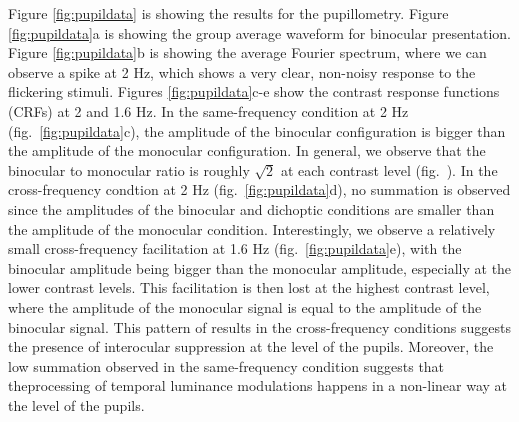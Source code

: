 \documentclass[
]{article}
\begin{document}
Figure \ref{fig:pupildata} is showing the results for the pupillometry. Figure \ref{fig:pupildata}a is showing the group average waveform for binocular presentation. Figure \ref{fig:pupildata}b is showing the average Fourier spectrum, where we can observe a spike at 2 Hz, which shows a very clear, non-noisy response to the flickering stimuli. Figures \ref{fig:pupildata}c-e show the contrast response functions (CRFs) at 2 and 1.6 Hz. In the same-frequency condition at 2 Hz (fig.~\ref{fig:pupildata}c), the amplitude of the binocular configuration is bigger than the amplitude of the monocular configuration. In general, we observe that the binocular to monocular ratio is roughly \(\sqrt2\) at each contrast level (fig.~).
In the cross-frequency condtion at 2 Hz (fig.~\ref{fig:pupildata}d), no summation is observed since the amplitudes of the binocular and dichoptic conditions are smaller than the amplitude of the monocular condition. Interestingly, we observe a relatively small cross-frequency facilitation at 1.6 Hz (fig.~\ref{fig:pupildata}e), with the binocular amplitude being bigger than the monocular amplitude, especially at the lower contrast levels. This facilitation is then lost at the highest contrast level, where the amplitude of the monocular signal is equal to the amplitude of the binocular signal. This pattern of results in the cross-frequency conditions suggests the presence of interocular suppression at the level of the pupils. Moreover, the low summation observed in the same-frequency condition suggests that theprocessing of temporal luminance modulations happens in a non-linear way at the level of the pupils.
\end{document}
